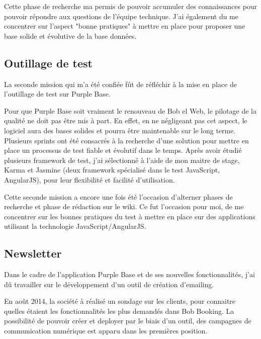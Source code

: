 Cette phase de recherche ma permis de pouvoir accumuler des connaissances pour pouvoir répondre aux questions de l'équipe technique. 
J'ai également du me concentrer sur l'aspect "bonne pratiques" à mettre en place pour proposer une base solide et évolutive de la base données.  


\subsection{Outillage de test}
La seconde mission qui m'a été confiée fût de réfléchir à la mise en place de l'outillage de test sur Purple Base. 

Pour que Purple Base soit vraiment le renouveau de Bob el Web, le pilotage de la qualité ne doit pas être mis à part. 
En effet, en ne négligeant pas cet aspect, le logiciel aura des bases solides et pourra être maintenable sur le long terme. 
\jumpOne
Plusieurs sprints ont été consacrés à la recherche d'une solution pour mettre en place un processus de test fiable et évolutif dans le temps. 
Après avoir étudié plusieurs framework de test, j'ai sélectionné à l'aide de mon maitre de stage, Karma et Jasmine (deux framework spécialisé dans le test JavaScript, AngularJS), pour leur flexibilité et facilité d'utilisation. 

Cette seconde mission a encore une fois été l'occasion d'alterner phases de recherche et phase de rédaction sur le wiki. 
Ce fut l'occasion pour moi, de me concentrer sur les bonnes pratiques du test à mettre en place sur des applications utilisant la technologie JavaScript/AngularJS. 


\subsection{Newsletter}


Dans le cadre de l'application Purple Base et de ses nouvelles fonctionnalités, j'ai dû travailler sur le développement d'un outil de création d'emailing. 

En août 2014, la société à réalisé un sondage sur les clients, pour connaitre quelles étaient les fonctionnalités les plus demandés dans Bob Booking. 
La possibilité de pouvoir créer et deployer par le biais d'un outil, des campagnes de communication numérique est apparu dans les premières position.
 

